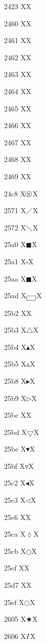 \documentclass[11pt]{article}
\begin{document}
2423 X{\textvisiblespace}X

2460 X{}X

2461 X{}X

2462 X{}X

2463 X{}X

2464 X{}X

2465 X{}X

2466 X{}X

2467 X{}X

2468 X{}X

2469 X{}X

24c8 X{\ensuremath{\circledS}}X

2571 X{\ensuremath{\diagup}}X

2572 X{\ensuremath{\diagdown}}X

25a0 X{\ensuremath{\blacksquare}}X

25a1 X{\ensuremath{\square}}X

25aa X{\ensuremath{\blacksquare}}X

25ad X{\ensuremath{\fbox{~~}}}X

25b2 X{}X

25b3 X{\ensuremath{\bigtriangleup}}X

25b4 X{\ensuremath{\blacktriangle}}X

25b5 X{\ensuremath{\vartriangle}}X

25b8 X{\ensuremath{\blacktriangleright}}X

25b9 X{\ensuremath{\triangleright}}X

25bc X{}X

25bd X{\ensuremath{\bigtriangledown}}X

25be X{\ensuremath{\blacktriangledown}}X

25bf X{\ensuremath{\triangledown}}X

25c2 X{\ensuremath{\blacktriangleleft}}X

25c3 X{\ensuremath{\triangleleft}}X

25c6 X{}X

25ca X{\ensuremath{\lozenge}}X

25cb X{\ensuremath{\bigcirc}}X

25cf X{}X

25d7 X{}X

25ef X{\ensuremath{\bigcirc}}X

2605 X{\ensuremath{\bigstar}}X

2606 X{\ensuremath{\ding{73}}}X
\end{document}
